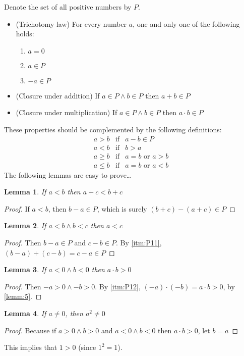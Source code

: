 \documentclass[a4paper,11pt,twoside]{book}
\theoremstyle{definition} \newtheorem{definition}{Definition}[chapter]
\theoremstyle{plain}      \newtheorem{id}{Lemma}
\theoremstyle{remark} \newtheorem*{ab}{Remark}
\begin{document}
  Denote the set of all positive numbers by $P$.
  \begin{itemize}[label=\textnormal{(\arabic*)}]
    \item[\mylabel{itm:P10}{(P10)}](Trichotomy law)
    For every number $a$, one and only one of the following
    holds:
    \begin{enumerate}[label=(\roman*)]
      \item $a=0$
      \item $a\in P$
      \item $-a\in P$
    \end{enumerate}
    \item[\mylabel{itm:P11}{(P11)}](Closure under addition)
    If $a\in P \land b\in P$ then $a+b\in P$
    \item[\mylabel{itm:P12}{(P12)}](Closure under multiplication)
    If $a\in P \land b\in P$ then $a\cdot b \in P$
  \end{itemize}
  These properties should be complemented by the following
  definitions:
  \begin{equation*}
    \begin{array}{rcl}
      a>b & \text{if} & a-b \in P \\
      a<b & \text{if} & b>a \\
      a\geq b & \text{if} & a=b \text{ or } a>b\\
      a\leq b & \text{if} & a=b \text{ or } a<b
    \end{array}
  \end{equation*}
  The following lemmas are easy to prove\ldots
  \begin{id}
    If $a<b$ then $a+c<b+c$
  \end{id}
  \begin{proof}
    If $a<b$, then $b-a\in P$, which is surely $(b+c)-(a+c)
    \in P$
  \end{proof}
  \begin{id}
    If $a<b \land b<c$ then $a<c$
  \end{id}
  \begin{proof}
    Then $b-a \in P$ and $c-b \in P$. By \ref{itm:P11},
    $(b-a)+(c-b)=c-a\in P$
  \end{proof}
  \begin{id}
    If $a<0 \land b<0$ then $a\cdot b>0$
  \end{id}
  \begin{proof}
    Then $-a>0 \land -b>0$. By \ref{itm:P12}, $(-a)\cdot
    (-b)=a\cdot b>0$, by \autoref{lemm:5}.
  \end{proof}
  \begin{id}
    If $a\neq 0$, then $a^2\neq 0$
  \end{id}
  \begin{proof}
    Because if $a>0 \land b>0$ and $a<0 \land b<0$ then
    $a\cdot b>0$, let $b=a$
  \end{proof}
  This implies that $1>0$ (since $1^2=1$).
\end{document}
